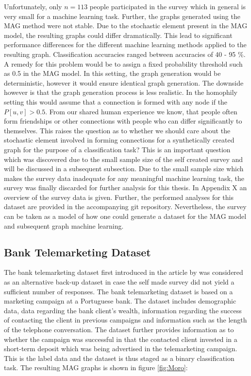   \noindent Unfortunately, only $n=113$ people participated in the survey which 
  in general is very small for a machine learning task.
  Further, the graphs generated using the MAG method were not stable. Due to
  the stochastic element present in the MAG model, the resulting graphs could
  differ dramatically. This lead to significant performance differences for the
  different machine learning methods applied to the resulting graph.
  Classification accuracies ranged between accuracies of 40 - 95 \%. A remedy
  for this problem would be to assign a fixed probability threshold such as 0.5
  in the MAG model. In this setting, the graph generation would be
  deterministic, however it would ensure identical graph generation. The
  downside however is that the graph generation process is less realistic. In
  the homophily setting this would assume that a connection is formed with any
  node if the $P[u,v]>0.5$. From our shared human experience we know, that
  people often form friendships or other connections with people who can differ
  significantly to themselves. This raises the question as to whether we should
  care about the stochastic element involved in forming connections for a
  synthetically created graph for the purpose of a classification task? This is
  an important question which was discovered due to the small sample size of
  the self created survey and will be discussed in a subsequent subsection. 
  Due to the small sample size which makes the survey data inadequate for any
  meaningful machine learning task, the survey was finally discarded for
  further analysis for this thesis. In Appendix X an overview of the survey
  data is given. Further, the performed analyses for this dataset are provided
  in the accompanying git repository. Nevertheless, the survey can be taken as
  a model of how one could generate a dataset for the MAG model and subsequent
  graph machine learning. 


  \subsection{Bank Telemarketing Dataset}

  The bank telemarketing dataset first introduced in the article by
  \cite{moro2014data} was considered as an alternative back-up dataset in case
  the self made survey did not yield a sufficient number of responses. The bank
  telemarketing dataset is based on a marketing campaign at a Portuguese bank.
  The dataset includes demographic data, data regarding the bank client's
  wealth, information regarding the success of contacting the client in
  previous campaigns and information such as the length of the telephone
  conversation. The dataset further provides information as to whether the 
  campaign was successful in that the contacted client invested in a short-term 
  deposit which was being advertised in the telemarketing campaign. This is the
  label data and the dataset is thus staged as a binary classification task.
  The resulting MAG graphs is shown in figure \ref{fig:Moro}:
 

